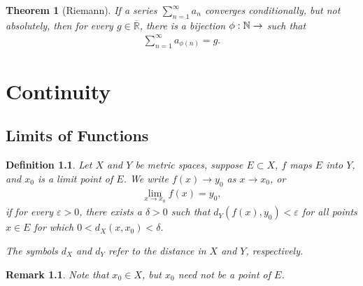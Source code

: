 \documentclass[10pt]{book}
\newtheorem{definition}{Definition}[chapter]
\newtheorem{theorem}{Theorem}[chapter]
\newtheorem{remark}{Remark}[chapter]
\theoremstyle{definition}
\numberwithin{equation}{chapter}
\begin{document}
\medskip

\begin{theorem}[Riemann]
If a series $\sum^\infty_{n=1} a_n$ converges conditionally, but not absolutely, then for every $g \in \overline{\mathbb{R}}$, there is a bijection $\phi: \mathbb{N} \to \markright{N}$ such that
\begin{align*}
    \sum^\infty_{n=1} a_{\phi(n)} = g.
\end{align*}
\end{theorem}




\chapter{Continuity}


\section{Limits of Functions}

\begin{definition}
Let $X$ and $Y$ be metric spaces, suppose $E \subset X$, $f$ maps $E$ into $Y$, and $x_0$ is a limit point of $E$. We write $f(x) \to y_0$ as $x \to x_0$, or
\begin{align*}
    \lim_{x \to x_0} f(x) = y_0,
\end{align*}
if for every $\varepsilon > 0$, there exists a $\delta > 0$ such that $d_Y(f(x), y_0) < \varepsilon$ for all points $x \in E$ for which $0 < d_X(x,x_0) < \delta$.

The symbols $d_X$ and $d_Y$ refer to the distance in $X$ and $Y$, respectively. 
\end{definition}

\begin{remark}
Note that $x_0 \in X$, but $x_0$ need not be a point of $E$. 
\end{remark}

\medskip
\end{document}

